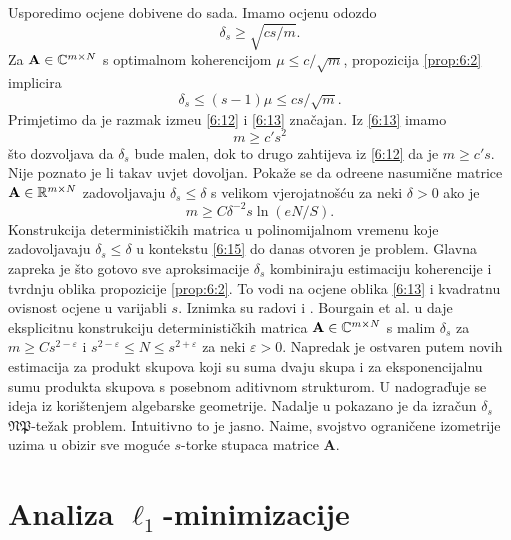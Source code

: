 \documentclass[a4paper,twoside,12pt]{memoir} %
\newcommand{\vect}[1]{\mathbf{#1}}
\renewcommand{\vec}{\vect}
\begin{document}
Usporedimo ocjene dobivene do sada. Imamo ocjenu odozdo
\begin{equation}\label{6:12}
    \delta_s \geq \sqrt{cs/m}. 
\end{equation}
Za $\vec A \in \C^{m \times N}$ s optimalnom koherencijom $\mu \leq c/\sqrt{m}$, propozicija \ref{prop:6:2} implicira
\begin{equation}\label{6:13}
    \delta_s \leq (s-1)\mu \leq cs/\sqrt{m}. 
\end{equation}
Primjetimo da je razmak izme\dj u \eqref{6:12} i \eqref{6:13} zna\v{c}ajan. Iz \eqref{6:13} imamo
\begin{equation}\label{6:14}
    m \geq c' s^2
\end{equation}
\v{s}to dozvoljava da $\delta_s$ bude malen, dok to drugo zahtijeva iz \eqref{6:12} da je $m \geq c's$. Nije poznato je li takav uvjet dovoljan. Poka\v{z}e se da odre\dj ene nasumi\v{c}ne matrice $\vec A \in \R^{m \times N}$ zadovoljavaju $\delta_s \leq \delta$ s velikom vjerojatno\v{s}\'cu za neki $\delta > 0$ ako je
\begin{equation}\label{6:15}
    m \geq C \delta^{-2}s \ln(eN/S).
\end{equation}
Konstrukcija deterministi\v{c}kih matrica u polinomijalnom vremenu koje zadovoljavaju $\delta_s \leq \delta$ u kontekstu \eqref{6:15} do danas otvoren je problem. Glavna zapreka je \v{s}to gotovo sve aproksimacije $\delta_s$ kombiniraju estimaciju koherencije i tvrdnju oblika propozicije \ref{prop:6:2}. To vodi na ocjene oblika \eqref{6:13} i kvadratnu ovisnost ocjene u varijabli $s$. Iznimka su radovi \cite{2010arXiv1008.4535B} i \cite{DBLP:journals/corr/Chen15n}. Bourgain et al. u \cite{2010arXiv1008.4535B} daje eksplicitnu konstrukciju deterministi\v{c}kih matrica $\vec A \in \C^{m \times N}$ s malim $\delta_s$ za $m \geq Cs^{2-\varepsilon}$ i $ s^{2-\varepsilon} \leq N \leq s^{2+\varepsilon}$ za neki $\varepsilon > 0$. Napredak je ostvaren putem novih estimacija za produkt skupova koji su suma dvaju skupa i za eksponencijalnu sumu produkta skupova s posebnom aditivnom strukturom. U \cite{DBLP:journals/corr/Chen15n} nadogra\v{d}uje se ideja iz \cite{2010arXiv1008.4535B} kori\v{s}tenjem algebarske geometrije. Nadalje u \cite{2012arXiv1205.2081T} pokazano je da izra\v{c}un $\delta_s$ $\mathfrak{NP}$-te\v{z}ak problem. Intuitivno to je jasno. Naime, svojstvo ograni\v{c}ene izometrije uzima u obizir sve mogu\'ce $s$-torke stupaca matrice $\vec A$.

\newpage
\section[Analiza $\ell_1$-minimizacije][Analiza $\ell_1$-minimizacije]{Analiza $\ell_1$-minimizacije}
\end{document}
